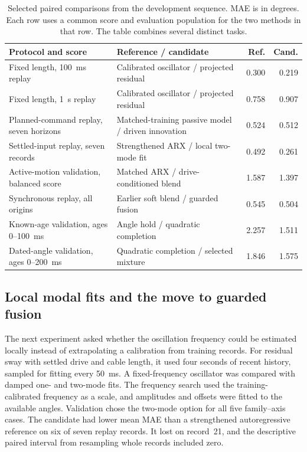 \begin{table}[tbp]
\centering
\small
\caption{Selected paired comparisons from the development sequence. MAE is in degrees. Each row uses a common score and evaluation population for the two methods in that row. The table combines several distinct tasks.}
\label{tab:development-comparisons}
\renewcommand{\arraystretch}{1.14}
\begin{tabular}{@{}p{.34\linewidth}p{.39\linewidth}rr@{}}
\toprule
\raggedright Protocol and score & \raggedright Reference / candidate & Ref. & Cand. \\
\midrule
\raggedright Fixed length, 100~ms replay & \raggedright Calibrated oscillator / projected residual & 0.300 & 0.219 \\
\raggedright Fixed length, 1~s replay & \raggedright Calibrated oscillator / projected residual & 0.758 & 0.907 \\
\addlinespace[3pt]
\raggedright Planned-command replay, seven horizons & \raggedright Matched-training passive model / driven innovation & 0.524 & 0.512 \\
\raggedright Settled-input replay, seven records & \raggedright Strengthened ARX / local two-mode fit & 0.492 & 0.261 \\
\raggedright Active-motion validation, balanced score & \raggedright Matched ARX / drive-conditioned blend & 1.587 & 1.397 \\
\raggedright Synchronous replay, all origins & \raggedright Earlier soft blend / guarded fusion & 0.545 & 0.504 \\
\addlinespace[3pt]
\raggedright Known-age validation, ages 0--100~ms & \raggedright Angle hold / quadratic completion & 2.257 & 1.511 \\
\raggedright Dated-angle validation, ages 0--200~ms & \raggedright Quadratic completion / selected mixture & 1.846 & 1.575 \\
\bottomrule
\end{tabular}
\end{table}

\subsection{Local modal fits and the move to guarded fusion}

The next experiment asked whether the oscillation frequency could be estimated locally instead of extrapolating a calibration from training records. For residual sway with settled drive and cable length, it used four seconds of recent history, sampled for fitting every 50~ms. A fixed-frequency oscillator was compared with damped one- and two-mode fits. The frequency search used the training-calibrated frequency as a scale, and amplitudes and offsets were fitted to the available angles. Validation chose the two-mode option for all five family--axis cases. The candidate had lower mean MAE than a strengthened autoregressive reference on six of seven replay records. It lost on record~21, and the descriptive paired interval from resampling whole records included zero.

